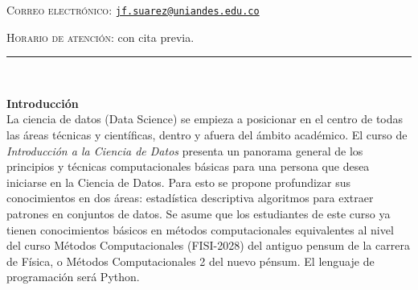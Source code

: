 \documentclass[letterpaper,10pt,onecolumn]{article}
\begin{document}
\noindent\textsc{Correo electr\'onico:}
\href{mailto:jf.suarez@uniandes.edu.co}{\nolinkurl{jf.suarez@uniandes.edu.co}}

\noindent\textsc{Horario de atenci\'on:} con cita previa. 






\noindent\rule{\textwidth}{1pt}\\[-0.1cm]

\addtocounter{mysection}{1}

\noindent\textbf{\large {} \quad Introducci\'on}\\[-0.2cm]


\noindent\normalsize 
La ciencia de datos (Data Science) se empieza a posicionar en el centro de 
todas las \'areas t\'ecnicas y cient\'ificas, dentro y afuera del
\'ambito acad\'emico.
El curso de \textit{Introducci\'on a la Ciencia de Datos}
presenta un panorama general de los principios y técnicas computacionales 
básicas para una persona que desea iniciarse en la Ciencia de Datos.
Para esto se propone profundizar sus conocimientos
en dos \'areas: estadística descriptiva algoritmos para extraer patrones en
conjuntos de datos.
Se asume que los estudiantes de este curso ya tienen conocimientos
b\'asicos en m\'etodos computacionales equivalentes al nivel del curso
M\'etodos Computacionales (FISI-2028) del antiguo pensum de la carrera de Física, o
Métodos Computacionales 2 del nuevo pénsum.
El lenguaje de programaci\'on ser\'a Python.
\\[0.1cm] 
\end{document}
